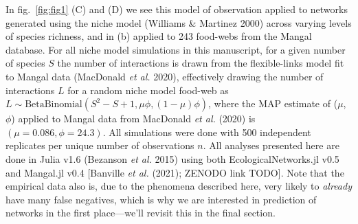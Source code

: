 \documentclass[11pt]{article}
\begin{document}
In fig.~\ref{fig:fig1} (C) and (D) we see this model of observation
applied to networks generated using the niche model (Williams \&
Martinez 2000) across varying levels of species richness, and in (b)
applied to 243 food-webs from the Mangal database. For all niche model
simulations in this manuscript, for a given number of species \(S\) the
number of interactions is drawn from the flexible-links model fit to
Mangal data (MacDonald \emph{et al.} 2020), effectively drawing the
number of interactions \(L\) for a random niche model food-web as
\(L \sim \text{BetaBinomial}(S^2-S+1, \mu \phi, (1-\mu)\phi)\), where
the MAP estimate of (\(\mu\), \(\phi\)) applied to Mangal data from
MacDonald \emph{et al.} (2020) is \((\mu = 0.086, \phi =24.3)\). All
simulations were done with 500 independent replicates per unique number
of observations \(n\). All analyses presented here are done in Julia
v1.6 (Bezanson \emph{et al.} 2015) using both EcologicalNetworks.jl v0.5
and Mangal.jl v0.4 {[}Banville \emph{et al.} (2021); ZENODO link
TODO{]}. Note that the empirical data also is, due to the phenomena
described here, very likely to \emph{already} have many false negatives,
which is why we are interested in prediction of networks in the first
place---we'll revisit this in the final section.
\end{document}
